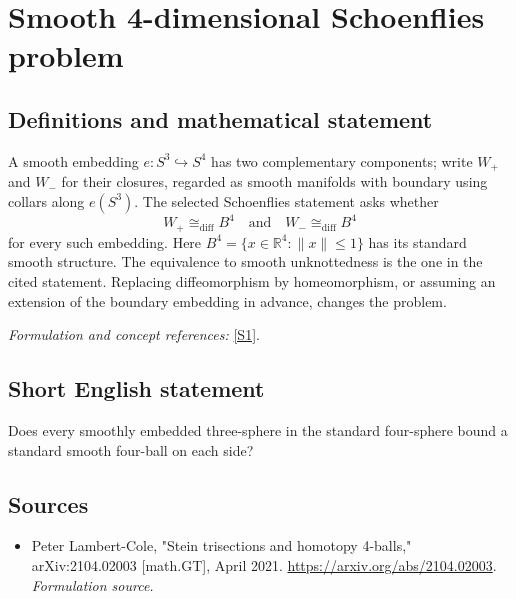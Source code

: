 \documentclass[11pt]{article}
\begin{document}
\section*{\texorpdfstring{Smooth 4-dimensional Schoenflies problem}{Smooth 4-dimensional Schoenflies problem}}\label{3410}
\subsection{Definitions and mathematical statement}
A smooth embedding $e:S^3\hookrightarrow S^4$ has two complementary components; write $W_+$ and $W_-$ for their closures, regarded as smooth manifolds with boundary using collars along $e(S^3)$. The selected Schoenflies statement asks whether
\[
 W_+\cong_{\mathrm{diff}}B^4\quad\text{and}\quad W_-\cong_{\mathrm{diff}}B^4
\]
for every such embedding. Here $B^4=\{x\in{\mathbb{R}}^4:\|x\|\le1\}$ has its standard smooth structure. The equivalence to smooth unknottedness is the one in the cited statement. Replacing diffeomorphism by homeomorphism, or assuming an extension of the boundary embedding in advance, changes the problem.
\par\smallskip\textit{Formulation and concept references:} \href{https://arxiv.org/abs/2104.02003}{[S1]}.

\subsection{Short English statement}
Does every smoothly embedded three-sphere in the standard four-sphere bound a standard smooth four-ball on each side?
\subsection{Sources}
\begin{itemize}
\item[S1]Peter Lambert-Cole, "Stein trisections and homotopy 4-balls," arXiv:2104.02003 [math.GT], April 2021.
\url{https://arxiv.org/abs/2104.02003}.
\textit{Formulation source.}
\end{itemize}
\end{document}
